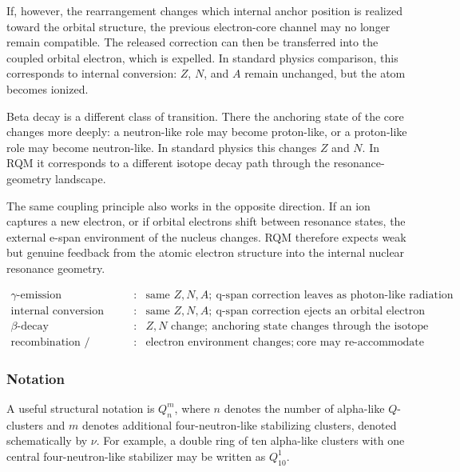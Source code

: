 \documentclass[11pt,a4paper]{article}
\begin{document}
If, however, the rearrangement changes which internal anchor position is realized toward the orbital structure, the previous electron-core channel may no longer remain compatible. The released correction can then be transferred into the coupled orbital electron, which is expelled. In standard physics comparison, this corresponds to internal conversion: \(Z\), \(N\), and \(A\) remain unchanged, but the atom becomes ionized.

Beta decay is a different class of transition. There the anchoring state of the core changes more deeply: a neutron-like role may become proton-like, or a proton-like role may become neutron-like. In standard physics this changes \(Z\) and \(N\). In RQM it corresponds to a different isotope decay path through the resonance-geometry landscape.

The same coupling principle also works in the opposite direction. If an ion captures a new electron, or if orbital electrons shift between resonance states, the external e-span environment of the nucleus changes. RQM therefore expects weak but genuine feedback from the atomic electron structure into the internal nuclear resonance geometry.

\[
\begin{array}{lll}
\gamma\text{-emission}
&:&
\text{same } Z,N,A;\ \text{q-span correction leaves as photon-like radiation}
\\[1mm]

\text{internal conversion}
&:&
\text{same } Z,N,A;\ \text{q-span correction ejects an orbital electron}
\\[1mm]

\beta\text{-decay}
&:&
Z,N \text{ change};\ \text{anchoring state changes through the isotope landscape}
\\[1mm]

\text{recombination / orbital shift}
&:&
\text{electron environment changes};\ \text{core may re-accommodate}
\end{array}
\]


\subsubsection{Notation}

A useful structural notation is \(Q_n^m\), where \(n\) denotes the number of alpha-like \(Q\)-clusters and \(m\) denotes additional four-neutron-like stabilizing clusters, denoted schematically by \(\nu\). For example, a double ring of ten alpha-like clusters with one central four-neutron-like stabilizer may be written as \(Q_{10}^{1}\).
\end{document}
